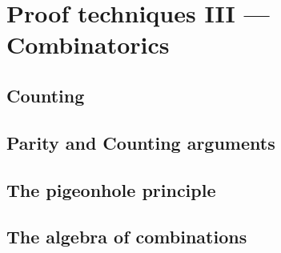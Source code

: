 
\chapter{Proof techniques III --- Combinatorics}

\section{Counting}
\label{sec:counting}



\clearpage

\section{Parity and Counting arguments}




\clearpage


\section{The pigeonhole principle}




\clearpage

\section{The algebra of combinations}






